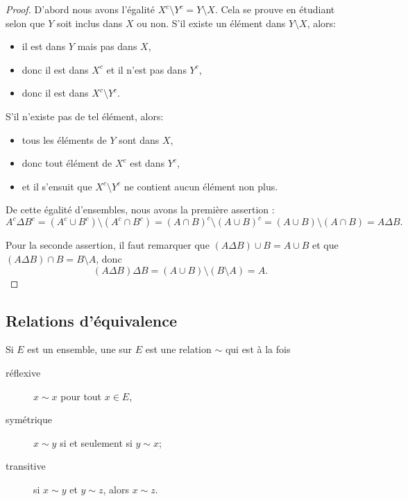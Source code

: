 \begin{proof}
    D'abord nous avons l'égalité \( X^c\setminus Y^c=Y\setminus X\). Cela se prouve en étudiant selon que \( Y\) soit inclus dans \( X\) ou non. S'il existe un élément dans \(Y\setminus X\), alors:
    \begin{itemize}
     \item il est dans \(Y \) mais pas dans \(X \),
     \item donc il est dans \(X^c \) et il n'est pas dans \(Y^c\),
     \item donc il est dans \( X^c\setminus Y^c \).
    \end{itemize}
    S'il n'existe pas de tel élément, alors:
    \begin{itemize}
    \item tous les éléments de \(Y \) sont dans \(X \),
    \item donc tout élément de \(X^c \) est dans \(Y^c \),
    \item et il s'ensuit que \( X^c\setminus Y^c \) ne contient aucun élément non plus.
    \end{itemize}
   
    De cette égalité d'ensembles, nous avons la première assertion :
    \begin{equation}
        A^c\Delta B^c=(A^c\cup B^c)\setminus(A^c\cap B^c)=(A\cap B)^c\setminus(A\cup B)^c=(A\cup B)\setminus (A\cap B)=A\Delta B.
    \end{equation}

    Pour la seconde assertion, il faut remarquer que \( (A\Delta B)\cup B=A\cup B\) et que \( (A\Delta B)\cap B=B\setminus A\), donc
    \begin{equation}
        (A\Delta B)\Delta B=(A\cup B)\setminus (B\setminus A)=A.
    \end{equation}
\end{proof}

\subsection{Relations d'équivalence}
\label{appEquivalence}

\begin{definition}  \label{DefHoJzMp}
Si $E$ est un ensemble, une  sur $E$ est une relation $\sim$ qui est à la fois
\begin{description}
	\item[réflexive] $x\sim x$ pour tout $x\in E$,
	\item[symétrique] $x\sim y$ si et seulement si $y\sim x$;
	\item[transitive] si $x\sim y$ et $y\sim z$, alors $x\sim z$.
\end{description}
\end{definition}

